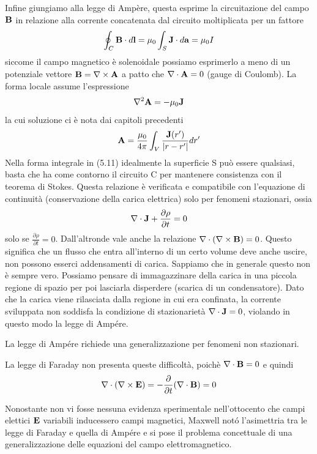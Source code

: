 Infine giungiamo alla legge di Amp\`ere, questa esprime la circuitazione del campo $\bold{B}$ in relazione alla corrente concatenata dal circuito moltiplicata per un fattore 
\begin{equation}
	\oint_{C} \bold{B} \cdot d\bold{l} = \mu_0 \int_{S} \bold{J} \cdot d\bold{a} = \mu_0 I
\end{equation} 
siccome il campo magnetico \`e solenoidale possiamo esprimerlo a meno di un potenziale vettore $\bold{B} = \nabla \times \bold{A}$ a patto che $\nabla \cdot \bold{A} = 0$ (gauge di Coulomb). La forma locale assume l'espressione
\begin{equation*}
	\nabla^2 \bold{A} = - \mu_0 \bold{J}
\end{equation*}
la cui soluzione ci \`e nota dai capitoli precedenti 
\begin{equation*}
	\bold{A} = \frac{\mu_0}{4 \pi} \int_{V} \frac{\bold{J}(r')}{|r-r'|}dr'
\end{equation*}
Nella forma integrale in (5.11) idealmente la superficie S pu\`o essere qualsiasi, basta che ha come contorno il circuito C per mantenere consistenza con il teorema di Stokes.  Questa relazione \`e verificata  e compatibile con l'equazione di continuit\`a (conservazione della carica elettrica) solo per fenomeni stazionari, ossia 
\begin{equation*}
	\nabla \cdot \bold{J} + \frac{\partial \rho}{\partial t}= 0
\end{equation*}
solo se $\frac{\partial \rho}{\partial t} = 0$. Dall'altronde vale anche la relazione $\nabla \cdot (\nabla \times \bold{B}) = 0$. Questo significa che un flusso che entra all'interno di un certo volume deve anche uscire, non possono esserci addensamenti di carica. Sappiamo che in generale questo non \`e sempre vero. Possiamo pensare di immagazzinare della carica in una piccola regione di spazio per poi lasciarla disperdere (scarica di un condensatore). Dato che la carica viene rilasciata dalla regione in cui era confinata, la corrente sviluppata non soddisfa la condizione di stazionariet\`a $\nabla \cdot \bold{J} = 0$, violando in questo modo la legge di Amp\'ere.

La legge di Amp\'ere richiede una generalizzazione per fenomeni non stazionari.

\begin{remark}
La legge di Faraday non presenta queste difficolt\`a, poich\`e $\nabla \cdot \bold{B} = 0$ e quindi 
\begin{equation*}
	\nabla \cdot (\nabla \times \bold{E} ) = - \frac{\partial }{\partial t}(\nabla \cdot \bold{B})= 0
\end{equation*}
\end{remark}
Nonostante non vi fosse nessuna evidenza sperimentale nell'ottocento che campi elettici $\bold{E}$ variabili inducessero campi magnetici, Maxwell not\'o l'asimettria tra le legge di Faraday e quella di Amp\'ere e si pose il problema concettuale di una generalizzazione delle equazioni del campo elettromagnetico.
\newpage


